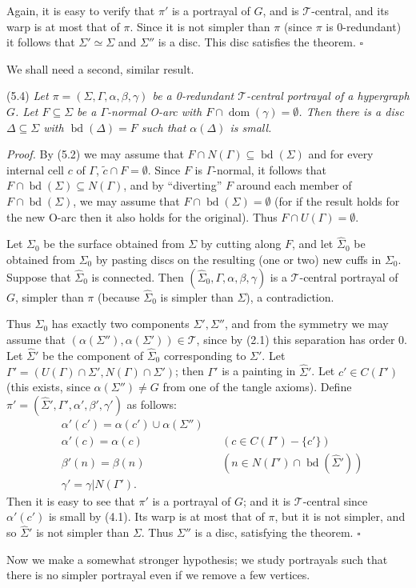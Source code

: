 Again, it is easy to verify that $\pi'$ is a portrayal of $G$, and is $\mathscr{T}$-central, and its warp is at most that of $\pi$. Since it is not simpler than $\pi$ (since $\pi$ is 0-redundant) it follows that $\Sigma' \simeq \Sigma$ and $\Sigma''$ is a disc. This disc satisfies the theorem. $\square$

We shall need a second, similar result.

\stmt
(5.4) \textit{Let $\pi = (\Sigma, \Gamma, \alpha, \beta, \gamma)$ be a 0-redundant $\mathscr{T}$-central portrayal of a hypergraph $G$. Let $F \subseteq \Sigma$ be a $\Gamma$-normal O-arc with $F \cap \operatorname{dom}(\gamma) = \emptyset$. Then there is a disc $\Delta \subseteq \Sigma$ with $\operatorname{bd}(\Delta) = F$ such that $\alpha(\Delta)$ is small.}

\textit{Proof.} By (5.2) we may assume that $F \cap N(\Gamma) \subseteq \operatorname{bd}(\Sigma)$ and for every internal cell $c$ of $\Gamma$, $\tilde{c} \cap F = \emptyset$. Since $F$ is $\Gamma$-normal, it follows that $F \cap \operatorname{bd}(\Sigma) \subseteq N(\Gamma)$, and by ``diverting'' $F$ around each member of $F \cap \operatorname{bd}(\Sigma)$, we may assume that $F \cap \operatorname{bd}(\Sigma) = \emptyset$ (for if the result holds for the new O-arc then it also holds for the original). Thus $F \cap U(\Gamma) = \emptyset$.

Let $\Sigma_0$ be the surface obtained from $\Sigma$ by cutting along $F$, and let $\hat{\Sigma}_0$ be obtained from $\Sigma_0$ by pasting discs on the resulting (one or two) new cuffs in $\Sigma_0$. Suppose that $\hat{\Sigma}_0$ is connected. Then $(\hat{\Sigma}_0, \Gamma, \alpha, \beta, \gamma)$ is a $\mathscr{T}$-central portrayal of $G$, simpler than $\pi$ (because $\hat{\Sigma}_0$ is simpler than $\Sigma$), a contradiction.

Thus $\Sigma_0$ has exactly two components $\Sigma', \Sigma''$, and from the symmetry we may assume that $(\alpha(\Sigma''), \alpha(\Sigma')) \in \mathscr{T}$, since by (2.1) this separation has order 0. Let $\hat{\Sigma}'$ be the component of $\hat{\Sigma}_0$ corresponding to $\Sigma'$. Let $\Gamma' = (U(\Gamma) \cap \Sigma', N(\Gamma) \cap \Sigma')$; then $\Gamma'$ is a painting in $\hat{\Sigma}'$. Let $c' \in C(\Gamma')$ (this exists, since $\alpha(\Sigma'') \ne G$ from one of the tangle axioms). Define $\pi' = (\hat{\Sigma}', \Gamma', \alpha', \beta', \gamma')$ as follows:
\begin{align*}
&\alpha'(c') = \alpha(c') \cup \alpha(\Sigma'') \\
&\alpha'(c) = \alpha(c) &&(c \in C(\Gamma') - \{c'\}) \\
&\beta'(n) = \beta(n) &&(n \in N(\Gamma') \cap \operatorname{bd}(\hat{\Sigma}')) \\
&\gamma' = \gamma | N(\Gamma').
\end{align*}
Then it is easy to see that $\pi'$ is a portrayal of $G$; and it is $\mathscr{T}$-central since $\alpha'(c')$ is small by (4.1). Its warp is at most that of $\pi$, but it is not simpler, and so $\hat{\Sigma}'$ is not simpler than $\Sigma$. Thus $\Sigma''$ is a disc, satisfying the theorem. $\square$


Now we make a somewhat stronger hypothesis; we study portrayals such that there is no simpler portrayal even if we remove a few vertices.
